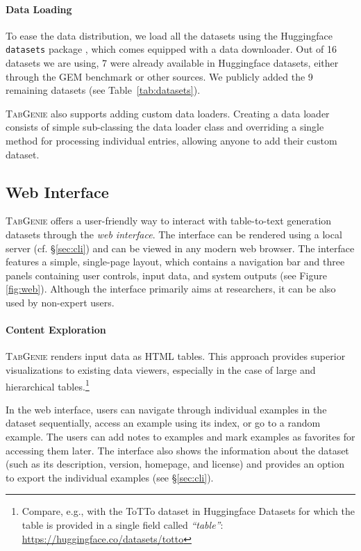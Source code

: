 \paragraph{Data Loading}
To ease the data distribution, we load all the datasets using the Huggingface \texttt{datasets} package \cite{lhoest2021datasets}, which comes equipped with a data downloader. Out of 16 datasets we are using, 7 were already available in Huggingface datasets, either through the GEM benchmark \cite{gehrmann2021gem} or other sources. We publicly added the 9 remaining datasets (see Table~\ref{tab:datasets}).


\textsc{TabGenie} also supports adding custom data loaders. Creating a data loader consists of simple sub-classing the data loader class and overriding a single method for processing individual entries, allowing anyone to add their custom dataset.

\subsection{Web Interface}
\label{sec:tabgenie:web}

\textsc{TabGenie} offers a user-friendly way to interact with table-to-text generation datasets through the \textit{web interface}. The interface can be rendered using a local server (cf. §\ref{sec:cli}) and can be viewed in any modern web browser. The interface features a simple, single-page layout, which contains a navigation bar and three panels containing user controls, input data, and system outputs (see Figure \ref{fig:web}). Although the interface primarily aims at researchers, it can be also used by non-expert users.



\paragraph{Content Exploration}
\textsc{TabGenie} renders input data as HTML tables. This approach provides superior visualizations to existing data viewers, especially in the case of large and hierarchical tables.\footnote{Compare, e.g., with the ToTTo dataset in Huggingface Datasets for which the table is provided in a single field called \textit{``table''}: \url{https://huggingface.co/datasets/totto}}

In the web interface, users can navigate through individual examples in the dataset sequentially, access an example using its index, or go to a random example. The users can add notes to examples and mark examples as favorites for accessing them later. The interface also shows the information about the dataset (such as its description, version, homepage, and license) and provides an option to export the individual examples (see §\ref{sec:cli}).



